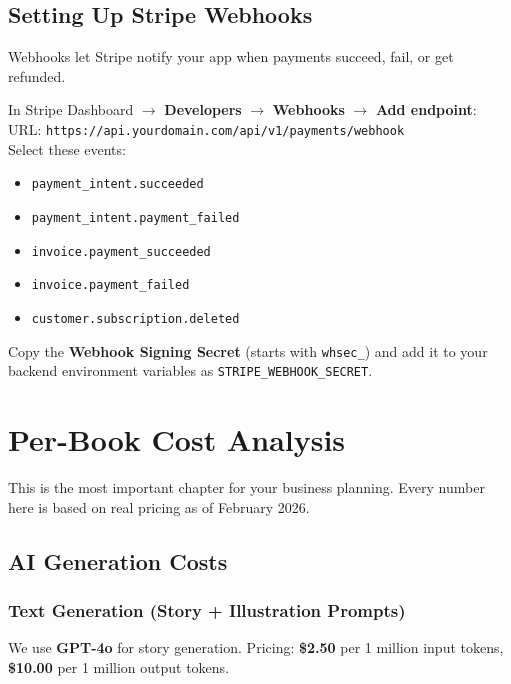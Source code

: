 \documentclass[12pt, letterpaper, oneside]{book}
\newcommand{\cost}[1]{\textcolor{money}{\textbf{#1}}}
\begin{document}
\section{Setting Up Stripe Webhooks}

Webhooks let Stripe notify your app when payments succeed, fail, or get refunded.

\begin{actionbox}
In Stripe Dashboard $\rightarrow$ \textbf{Developers} $\rightarrow$ \textbf{Webhooks} $\rightarrow$ \textbf{Add endpoint}:\\[4pt]
URL: \texttt{https://api.yourdomain.com/api/v1/payments/webhook}\\[4pt]
Select these events:
\begin{itemize}[leftmargin=1.5em]
  \item \texttt{payment\_intent.succeeded}
  \item \texttt{payment\_intent.payment\_failed}
  \item \texttt{invoice.payment\_succeeded}
  \item \texttt{invoice.payment\_failed}
  \item \texttt{customer.subscription.deleted}
\end{itemize}
Copy the \textbf{Webhook Signing Secret} (starts with \texttt{whsec\_}) and add it to your backend environment variables as \texttt{STRIPE\_WEBHOOK\_SECRET}.
\end{actionbox}


\chapter{Per-Book Cost Analysis}

This is the most important chapter for your business planning. Every number here is based on real pricing as of February 2026.

\section{AI Generation Costs}

\subsection{Text Generation (Story + Illustration Prompts)}

We use \textbf{GPT-4o} for story generation. Pricing: \cost{\$2.50} per 1 million input tokens, \cost{\$10.00} per 1 million output tokens.
\end{document}
